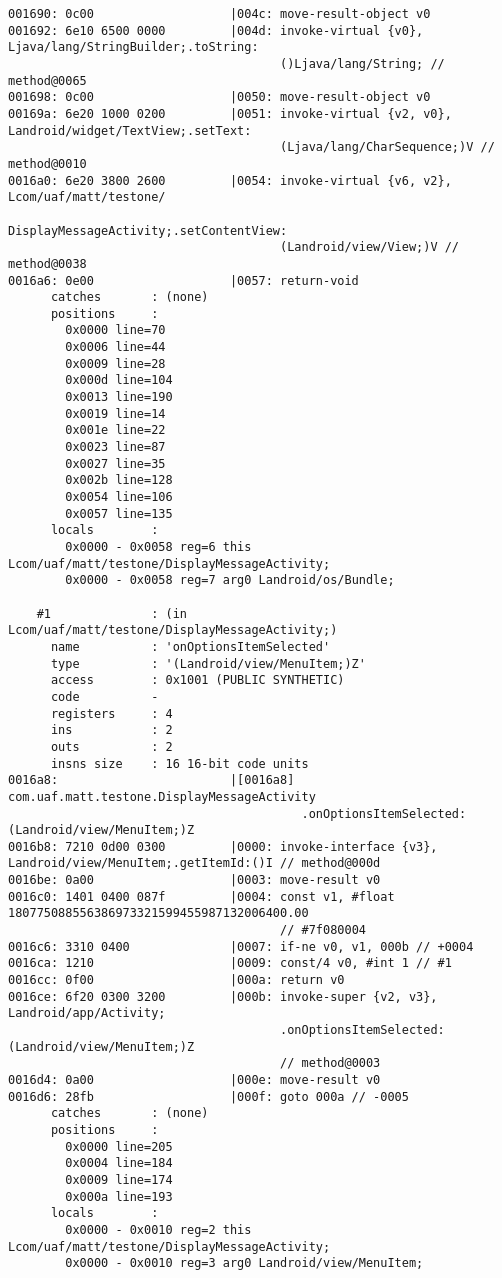 \begin{lstlisting}
001690: 0c00                   |004c: move-result-object v0
001692: 6e10 6500 0000         |004d: invoke-virtual {v0}, Ljava/lang/StringBuilder;.toString:
                                      ()Ljava/lang/String; // method@0065
001698: 0c00                   |0050: move-result-object v0
00169a: 6e20 1000 0200         |0051: invoke-virtual {v2, v0}, Landroid/widget/TextView;.setText:
                                      (Ljava/lang/CharSequence;)V // method@0010
0016a0: 6e20 3800 2600         |0054: invoke-virtual {v6, v2}, Lcom/uaf/matt/testone/
                                      DisplayMessageActivity;.setContentView:
                                      (Landroid/view/View;)V // method@0038
0016a6: 0e00                   |0057: return-void
      catches       : (none)
      positions     :
        0x0000 line=70
        0x0006 line=44
        0x0009 line=28
        0x000d line=104
        0x0013 line=190
        0x0019 line=14
        0x001e line=22
        0x0023 line=87
        0x0027 line=35
        0x002b line=128
        0x0054 line=106
        0x0057 line=135
      locals        :
        0x0000 - 0x0058 reg=6 this Lcom/uaf/matt/testone/DisplayMessageActivity;
        0x0000 - 0x0058 reg=7 arg0 Landroid/os/Bundle;

    #1              : (in Lcom/uaf/matt/testone/DisplayMessageActivity;)
      name          : 'onOptionsItemSelected'
      type          : '(Landroid/view/MenuItem;)Z'
      access        : 0x1001 (PUBLIC SYNTHETIC)
      code          -
      registers     : 4
      ins           : 2
      outs          : 2
      insns size    : 16 16-bit code units
0016a8:                        |[0016a8] com.uaf.matt.testone.DisplayMessageActivity
                                         .onOptionsItemSelected:(Landroid/view/MenuItem;)Z
0016b8: 7210 0d00 0300         |0000: invoke-interface {v3}, Landroid/view/MenuItem;.getItemId:()I // method@000d
0016be: 0a00                   |0003: move-result v0
0016c0: 1401 0400 087f         |0004: const v1, #float 180775088556386973321599455987132006400.00
                                      // #7f080004
0016c6: 3310 0400              |0007: if-ne v0, v1, 000b // +0004
0016ca: 1210                   |0009: const/4 v0, #int 1 // #1
0016cc: 0f00                   |000a: return v0
0016ce: 6f20 0300 3200         |000b: invoke-super {v2, v3}, Landroid/app/Activity;
                                      .onOptionsItemSelected:(Landroid/view/MenuItem;)Z
                                      // method@0003
0016d4: 0a00                   |000e: move-result v0
0016d6: 28fb                   |000f: goto 000a // -0005
      catches       : (none)
      positions     :
        0x0000 line=205
        0x0004 line=184
        0x0009 line=174
        0x000a line=193
      locals        :
        0x0000 - 0x0010 reg=2 this Lcom/uaf/matt/testone/DisplayMessageActivity;
        0x0000 - 0x0010 reg=3 arg0 Landroid/view/MenuItem;


\end{lstlisting}
